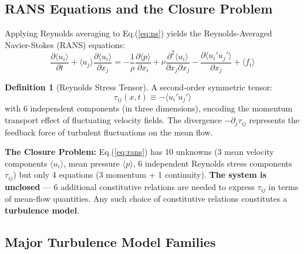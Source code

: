 \documentclass[12pt,a4paper]{article}
\theoremstyle{plain}
\theoremstyle{definition}
\newtheorem{definition}[theorem]{Definition}
\theoremstyle{remark}
\newcommand{\pdiff}{\partial}
\newcommand{\avg}[1]{\langle #1 \rangle}
\begin{document}
\subsection{RANS Equations and the Closure Problem}

Applying Reynolds averaging to Eq.(\ref{eq:ns}) yields the Reynolds-Averaged Navier-Stokes (RANS) equations:
\begin{equation}
\frac{\pdiff \avg{u_i}}{\pdiff t} + \avg{u_j} \frac{\pdiff \avg{u_i}}{\pdiff x_j}
= -\frac{1}{\rho}\frac{\pdiff \avg{p}}{\pdiff x_i}
+ \nu \frac{\pdiff^2 \avg{u_i}}{\pdiff x_j \pdiff x_j}
- \frac{\pdiff \avg{u_i' u_j'}}{\pdiff x_j} + \avg{f_i}
\label{eq:rans}
\end{equation}

\begin{definition}[Reynolds Stress Tensor]
A second-order symmetric tensor:
\begin{equation}
\tau_{ij}(x,t) \equiv -\avg{u_i' u_j'}
\end{equation}
with 6 independent components (in three dimensions), encoding the momentum transport effect of fluctuating velocity fields. The divergence $-\pdiff_j\tau_{ij}$ represents the feedback force of turbulent fluctuations on the mean flow.
\end{definition}

\textbf{The Closure Problem:} Eq.(\ref{eq:rans}) has 10 unknowns (3 mean velocity components $\avg{u_i}$, mean pressure $\avg{p}$, 6 independent Reynolds stress components $\tau_{ij}$) but only 4 equations (3 momentum + 1 continuity). \textbf{The system is unclosed} --- 6 additional constitutive relations are needed to express $\tau_{ij}$ in terms of mean-flow quantities. Any such choice of constitutive relations constitutes a \textbf{turbulence model}.

\subsection{Major Turbulence Model Families}
\end{document}
